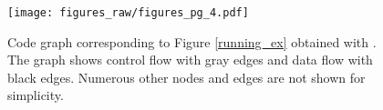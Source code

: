 \begin{figure}
\ncp\ncp
 \centering
  \texttt{[image: figures\_raw/figures\_pg\_4.pdf]}
  \ncp\ncp\ncp\ncp\ncp\ncp\ncp\ncp
  \caption{Code graph corresponding to Figure \ref{running_ex} obtained with {\sysGC}.  The graph shows control flow with gray edges and data flow with black edges. Numerous other nodes and edges are not shown for simplicity.}
  \label{static_analysis}
  \ncp\ncp\ncp\ncp\ncp\ncp\ncp
\end{figure}
